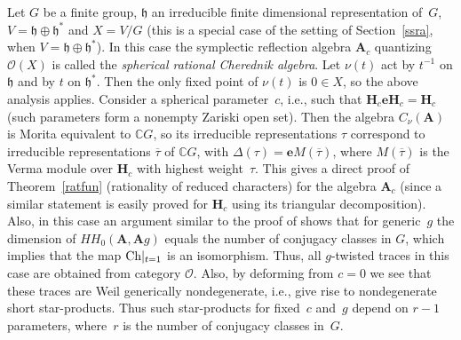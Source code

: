 \documentclass[pdftex]{sigma}
\numberwithin{equation}{section}
\newcommand{\h}{\mathfrak{h}}
\begin{document}
\begin{Example}\label{exa1} Let $G$ be a finite group, $\h$ an irreducible finite dimensional representation of~$G$, $V=\h\oplus \h^*$ and $X=V/G$ (this is a special case of the setting of Section~\ref{ssra}, when $V=\h\oplus \h^*$). In this case the symplectic reflection algebra ${\mathbf A}_c$ quantizing $\mathcal O(X)$ is called the {\it spherical rational Cherednik algebra}. Let $\nu(t)$ act by $t^{-1}$ on $\h$ and by $t$ on $\h^*$. Then the only fixed point of $\nu(t)$ is $0\in X$, so the above analysis applies. Consider a spherical parameter~$c$, i.e., such that ${\mathbf{H}}_c{\mathbf{e}}{\mathbf{H}}_c={\mathbf{H}}_c$ (such parameters form a nonempty Zariski open set). Then the algebra $C_\nu({\mathbf A})$ is Morita equivalent to ${\mathbb C}G$, so its irreducible representations $\tau$ correspond to irreducible representations $\overline\tau$ of ${\mathbb C}G$, with $\Delta(\tau)={\mathbf{e}} M(\overline\tau)$, where $M(\overline\tau)$ is the Verma module over ${\mathbf{H}}_c$ with highest weight~$\tau$. This gives a direct proof of Theorem~\ref{ratfun} (rationality of reduced characters) for the algebra ${\mathbf A}_c$ (since a similar statement is easily proved for ${\mathbf{H}}_c$ using its triangular decomposition). Also, in this case an argument similar to the proof of \cite[Theorem~1.8]{EG} shows that for generic~$g$ the dimension of $HH_0({\mathbf A},{\mathbf A} g)$ equals the number of conjugacy classes in $G$, which implies that the map ${\rm Ch}|_{t=1}$ is an isomorphism. Thus, all $g$-twisted traces in this case are obtained from category $\mathcal{O}$. Also, by deforming from $c=0$ we see that these traces are Weil generically nondegenerate, i.e., give rise to nondegenerate short star-products. Thus such star-products for fixed~$c$ and~$g$ depend on $r-1$ parameters, where~$r$ is the number of conjugacy classes in~$G$.
\end{Example}
\end{document}
